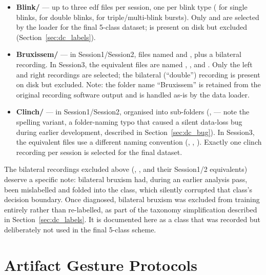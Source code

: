\begin{itemize}[leftmargin=*]
    \item \textbf{Blink/} --- up to three \acrshort{edf} files
    per session, one per blink type ( for
    single blinks,  for double blinks,
     for triple/multi-blink bursts). Only
     and  are selected by the loader
    for the final 5-class dataset;  is present on
    disk but excluded (Section~\ref{sec:dc_labels}).

    \item \textbf{Bruxissem/} --- in Session1/Session2, files
    named  and , plus a bilateral
    recording. In Session3, the equivalent files are named
    , , and
    . Only the left and right recordings are
    selected; the bilateral (``double'') recording is present on
    disk but excluded. Note: the folder name ``Bruxissem'' is
    retained from the original recording software output and is
    handled as-is by the data loader.

    \item \textbf{Clinch/} --- in Session1/Session2, organised
    into sub-folders (,  --- note
    the spelling variant, a folder-naming typo that caused a
    silent data-loss bug during earlier development, described in
    Section~\ref{sec:dc_bug}). In Session3, the equivalent files
    use a different naming convention (,
    , ). Exactly one clinch
    recording per session is selected for the final dataset.
\end{itemize}

The bilateral recordings excluded above (,
, and their Session1/2 equivalents) deserve a
specific note: bilateral bruxism had, during an earlier analysis
pass, been mislabelled and folded into the  class,
which silently corrupted that class's decision boundary. Once
diagnosed, bilateral bruxism was excluded from training entirely
rather than re-labelled, as part of the taxonomy simplification
described in Section~\ref{sec:dc_labels}. It is documented here
as a class that was recorded but deliberately not used in the
final 5-class scheme.

\section{Artifact Gesture Protocols}
\label{sec:dc_gestures}

